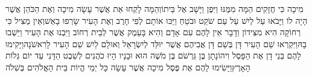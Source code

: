 \documentclass[../main/main.tex]{subfiles}
\begin{document}
\begin{multicols*}{\ncols}
מִיכָה כִּי חֲזָקִים הֵמָּה מִמֶּנּוּ וַיִּפֶן וַיָּשָׁב אֶל בֵּיתוֹ\PreVerseSpace{}וְהֵמָּה לָקְחוּ אֵת אֲשֶׁר עָשָׂה מִיכָה וְאֶת הַכֹּהֵן אֲשֶׁר הָיָה לוֹ וַיָּבֹאוּ עַל לַיִשׁ עַל עַם שֹׁקֵט וּבֹטֵחַ וַיַּכּוּ אוֹתָם לְפִי חָרֶב וְאֶת הָעִיר שָׂרְפוּ בָאֵשׁ\PreVerseSpace{}וְאֵין מַצִּיל כִּי רְחוֹקָה הִיא מִצִּידוֹן וְדָבָר אֵין לָהֶם עִם אָדָם וְהִיא בָּעֵמֶק אֲשֶׁר לְבֵית רְחוֹב וַיִּבְנוּ אֶת הָעִיר וַיֵּשְׁבוּ בָהּ\PreVerseSpace{}וַיִּקְרְאוּ שֵׁם הָעִיר דָּן בְּשֵׁם דָּן אֲבִיהֶם אֲשֶׁר יוּלַּד לְיִשְׂרָאֵל וְאוּלָם לַיִשׁ שֵׁם הָעִיר לָרִאשֹׁנָה\PreVerseSpace{}וַיָּקִימוּ לָהֶם בְּנֵי דָן אֶת הַפָּסֶל וִיהוֹנָתָן בֶּן גֵּרְשֹׁם בֶּן מֹשֶׁה\SubEnd{} הוּא וּבָנָיו הָיוּ כֹהֲנִים לְשֵׁבֶט הַדָּנִי עַד יוֹם גְּלוֹת הָאָרֶץ\PreVerseSpace{}וַיָּשִׂימוּ לָהֶם אֶת פֶּסֶל מִיכָה אֲשֶׁר עָשָׂה כָּל יְמֵי הֱיוֹת בֵּית הָאֱלֹהִים בְּשִׁלֹה\OpenSection{}\par

\end{multicols*}
\end{document}
